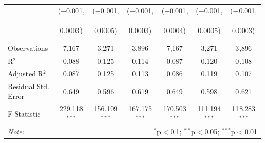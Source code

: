 \documentclass[alpha-refs]{wiley-article-01g}
\begin{document}
\begin{landscape}
\begin{table}[!htbp]
\begin{tabular}{@{\extracolsep{5pt}}lcccccc}
			& ($-$0.001, $-$0.0003) & ($-$0.001, $-$0.0005) & ($-$0.001, $-$0.0003) & ($-$0.001, $-$0.0004) & ($-$0.001, $-$0.0005) & ($-$0.001, $-$0.0003) \\ 
			& & & & & & \\ 
			\hline \\[-.8ex] 
			Observations & 7,167 & 3,271 & 3,896 & 7,167 & 3,271 & 3,896 \\ 
			R$^{2}$ & 0.088 & 0.125 & 0.114 & 0.087 & 0.120 & 0.108 \\ 
			Adjusted R$^{2}$ & 0.087 & 0.125 & 0.113 & 0.086 & 0.119 & 0.107 \\ 
			Residual Std. Error & 0.649 & 0.596 & 0.619 & 0.649 & 0.598 & 0.621 \\ 
			F Statistic & 229.118$^{***}$ & 156.109$^{***}$ & 167.175$^{***}$ & 170.503$^{***}$ & 111.194$^{***}$ & 118.283$^{***}$ \\ 
			\hline 
			\textit{Note:}  & \multicolumn{6}{r}{$^{*}$p$<$0.1; $^{**}$p$<$0.05; $^{***}$p$<$0.01} \\ 
		\end{tabular} 
	\end{table} 
	
\end{landscape}

\newpage
\end{document}

